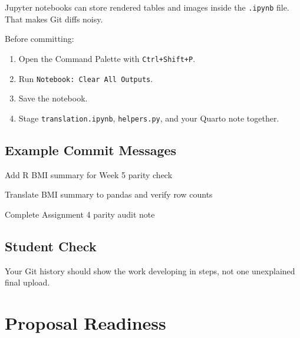 \documentclass[
  letterpaper,
  DIV=11,
  numbers=noendperiod,
  oneside]{scrreprt}
\newenvironment{Shaded}{\begin{snugshade}}{\end{snugshade}}
\newcommand{\NormalTok}[1]{\textcolor[rgb]{0.00,0.23,0.31}{#1}}
\providecommand{\tightlist}{%
  \setlength{\itemsep}{0pt}\setlength{\parskip}{0pt}}
\begin{document}
Jupyter notebooks can store rendered tables and images inside the
\texttt{.ipynb} file. That makes Git diffs noisy.

Before committing:

\begin{enumerate}
\def\labelenumi{\arabic{enumi}.}
\tightlist
\item
  Open the Command Palette with \texttt{Ctrl+Shift+P}.
\item
  Run \texttt{Notebook:\ Clear\ All\ Outputs}.
\item
  Save the notebook.
\item
  Stage \texttt{translation.ipynb}, \texttt{helpers.py}, and your Quarto
  note together.
\end{enumerate}

\section{Example Commit Messages}\label{example-commit-messages}

\begin{Shaded}
\begin{Highlighting}[numbers=left,,]
\NormalTok{Add R BMI summary for Week 5 parity check}
\end{Highlighting}
\end{Shaded}

\begin{Shaded}
\begin{Highlighting}[numbers=left,,]
\NormalTok{Translate BMI summary to pandas and verify row counts}
\end{Highlighting}
\end{Shaded}

\begin{Shaded}
\begin{Highlighting}[numbers=left,,]
\NormalTok{Complete Assignment 4 parity audit note}
\end{Highlighting}
\end{Shaded}

\section{Student Check}\label{student-check-2}

Your Git history should show the work developing in steps, not one
unexplained final upload.

\chapter{Proposal Readiness}\label{proposal-readiness}
\end{document}
